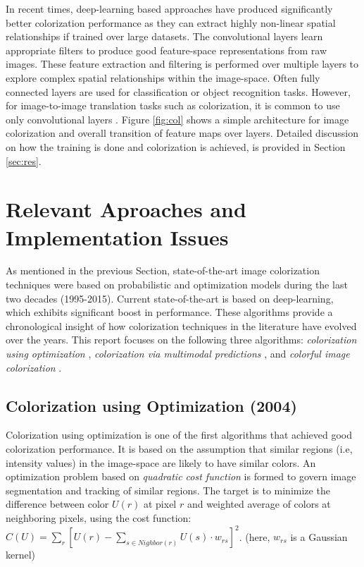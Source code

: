 \documentclass[10pt]{article}
\begin{document}
In recent times, deep-learning based approaches \cite{zhang2016colorful, cheng2015deep, varga2016fully, li2017watergan} have produced significantly better colorization performance as they can extract highly non-linear spatial relationships if trained over large datasets. 
The convolutional layers learn appropriate filters 
to produce good feature-space representations from raw images. 
These feature extraction and filtering is performed over multiple layers 
to explore complex spatial relationships within the image-space. 
Often fully connected layers are used for classification or object recognition tasks. 
However, for image-to-image translation tasks such as colorization, it is common to use only convolutional layers \cite{zhang2016colorful, cheng2015deep}. Figure \ref{fig:col} shows a simple architecture for image colorization and overall transition of feature maps over layers. Detailed discussion on how the training is done and colorization is achieved, is provided in Section \ref{sec:res}. 


\section{Relevant Aproaches and Implementation Issues}\label{sec:approaches}
As mentioned in the previous Section, state-of-the-art image colorization techniques were based on  probabilistic and optimization models during the last two decades (1995-2015). Current state-of-the-art is based on deep-learning, which exhibits significant boost in performance. These algorithms provide a chronological insight of how colorization techniques in the literature have evolved over the years. 
This report focuses on the following three algorithms: 
\textit{colorization using optimization} \cite{levin2004colorization}, \textit{colorization via multimodal predictions} \cite{charpiat2008automatic}, and \textit{colorful image colorization} \cite{zhang2016colorful}. 


\subsection{Colorization using Optimization (2004)}
Colorization using optimization \cite{levin2004colorization} is one of the first algorithms that achieved good colorization performance. It is based on the assumption that similar regions (i.e, intensity values) in the image-space are likely to have similar colors. An optimization problem based on \textit{quadratic cost function} is formed to govern image segmentation and tracking of similar regions. 
The target is to minimize the difference between 
color $U(r)$ at pixel $r$ and weighted average of
colors at neighboring pixels, using the cost function: $ C(U) = \sum_r [ U(r) - \sum_{s \in Nighbor(r)} U(s) \cdot w_{rs}  ]^2 $.  (here, $w_{rs}$ is a Gaussian kernel)
\end{document}

